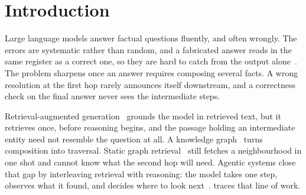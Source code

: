 %
%

\section{Introduction}\label{sec:intro}

Large language models answer factual questions fluently, and often
wrongly. The errors are systematic rather than random, and a fabricated
answer reads in the same register as a correct one, so they are hard to
catch from the output alone~\cite{huang2025survey}. The problem sharpens
once an answer requires composing several facts. A wrong resolution at
the first hop rarely announces itself downstream, and a correctness
check on the final answer never sees the intermediate steps.

Retrieval-augmented generation~\cite{lewis2020retrieval} grounds the
model in retrieved text, but it retrieves once, before reasoning begins,
and the passage holding an intermediate entity need not resemble the
question at all. A knowledge graph~\cite{bollacker2008freebase} turns
composition into traversal. Static graph retrieval~\cite{edge2024local}
still fetches a neighbourhood in one shot and cannot know what the
second hop will need. Agentic systems close that gap by interleaving
retrieval with reasoning: the model takes one step, observes what it
found, and decides where to look
next~\cite{sun2024think,chen2024plan,luo2024reasoning,luo2025kbqao1}.
 traces that line of work.

